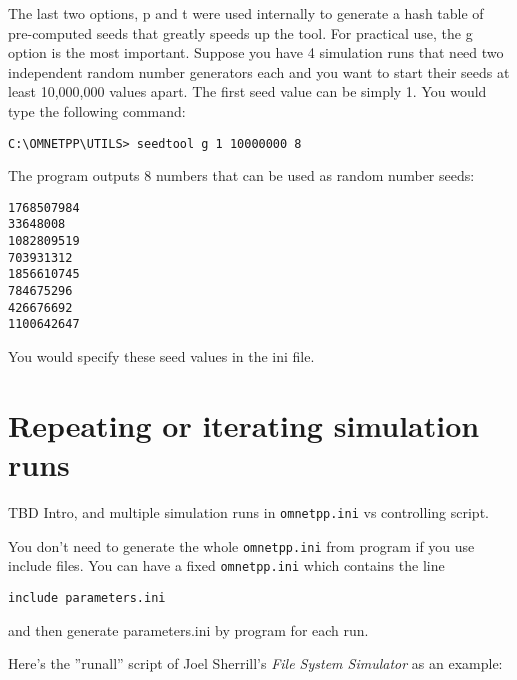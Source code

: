 The last two options, p and t were used internally to generate 
a hash table of pre-computed seeds that greatly speeds up the 
tool. For practical use, the g option is the most important. 
Suppose you have 4 simulation runs that need two independent 
random number generators each and you want to start their seeds 
at least 10,000,000 values apart. The first seed value can be 
simply 1. You would type the following command:

\begin{Verbatim}
C:\OMNETPP\UTILS> seedtool g 1 10000000 8
\end{Verbatim}


The program outputs 8 numbers that can be used as random number 
seeds:

\begin{Verbatim}
1768507984
33648008
1082809519
703931312
1856610745
784675296
426676692
1100642647
\end{Verbatim}


You would specify these seed values in the ini file.





\section{Repeating or iterating simulation runs}

TBD Intro, and multiple simulation runs in \texttt{omnetpp.ini} vs
controlling script.




You don't need to generate the whole \texttt{omnetpp.ini} from program if you
use include files. You can have a fixed
\texttt{omnetpp.ini} which contains the line

\begin{Verbatim}
include parameters.ini
\end{Verbatim}

and then generate parameters.ini by program for each run.


Here's the ''runall'' script of Joel Sherrill's \textit{File 
System Simulator} as an example:

